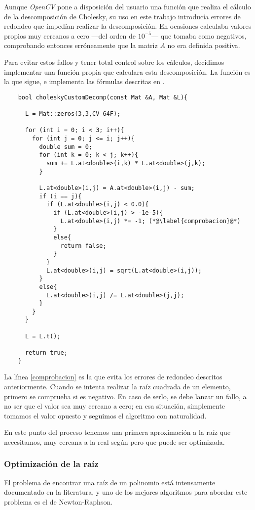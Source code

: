 \documentclass[a4paper, 11pt]{article}
\theoremstyle{definition}
\begin{document}
    Aunque \emph{OpenCV} pone a disposición del usuario una función que realiza el cálculo de la descomposición de Cholesky, su uso en este trabajo introducía errores de redondeo que impedían realizar la descomposición. En ocasiones calculaba valores propios muy cercanos a cero ---del orden de $10^{-5}$--- que tomaba como negativos, comprobando entonces erróneamente que la matriz $A$ no era definida positiva.

    Para evitar estos fallos y tener total control sobre los cálculos, decidimos implementar una función propia que calculara esta descomposición. La función es la que sigue, e implementa las fórmulas descritas en \cite{wikiChol}.
    \begin{lstlisting}
    bool choleskyCustomDecomp(const Mat &A, Mat &L){

      L = Mat::zeros(3,3,CV_64F);

      for (int i = 0; i < 3; i++){
        for (int j = 0; j <= i; j++){
          double sum = 0;
          for (int k = 0; k < j; k++){
            sum += L.at<double>(i,k) * L.at<double>(j,k);
          }

          L.at<double>(i,j) = A.at<double>(i,j) - sum;
          if (i == j){
            if (L.at<double>(i,j) < 0.0){
              if (L.at<double>(i,j) > -1e-5){
                L.at<double>(i,j) *= -1; (*@\label{comprobacion}@*)
              }
              else{
                return false;
              }
            }
            L.at<double>(i,j) = sqrt(L.at<double>(i,j));
          }
          else{
            L.at<double>(i,j) /= L.at<double>(j,j);
          }
        }
      }

      L = L.t();

      return true;
    }
    \end{lstlisting}

    La línea \ref{comprobacion} es la que evita los errores de redondeo descritos anteriormente. Cuando se intenta realizar la raíz cuadrada de un elemento, primero se comprueba si es negativo. En caso de serlo, se debe lanzar un fallo, a no ser que el valor sea muy cercano a cero; en esa situación, simplemente tomamos el valor opuesto y seguimos el algoritmo con naturalidad.

    En este punto del proceso tenemos una primera aproximación a la raíz que necesitamos, muy cercana a la real según \cite{LoopZhang} pero que puede ser optimizada.

    \subsubsection{Optimización de la raíz}
    El problema de encontrar una raíz de un polinomio está intensamente documentado en la literatura, y uno de los mejores algoritmos para abordar este problema es el de Newton-Raphson.
\end{document}
